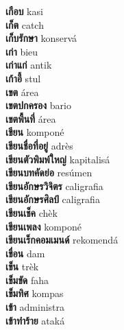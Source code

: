 \textbf{ เกือบ  } kasi \\
\textbf{ เก็ต  } catch \\
\textbf{ เก็บรักษา  } konservá \\
\textbf{ เก่า  } bieu \\
\textbf{ เก่าแก่  } antik \\
\textbf{ เก้าอี้  } stul \\
\textbf{ เขต  } área \\
\textbf{ เขตปกครอง  } bario \\
\textbf{ เขตพื้นที่  } área \\
\textbf{ เขียน  } komponé \\
\textbf{ เขียนชื่อที่อยู่  } adrès \\
\textbf{ เขียนตัวพิมพ์ใหญ่  } kapitalisá \\
\textbf{ เขียนบทคัดย่อ  } resúmen \\
\textbf{ เขียนอักษรวิจิตร  } caligrafia \\
\textbf{ เขียนอักษรศิลป์  } caligrafia \\
\textbf{ เขียนเช็ค  } chèk \\
\textbf{ เขียนเพลง  } komponé \\
\textbf{ เขียนเร็กคอมเมนด์  } rekomendá \\
\textbf{ เขื่อน  } dam \\
\textbf{ เข็น  } trèk \\
\textbf{ เข็มขัด  } faha \\
\textbf{ เข็มทิศ  } kompas \\
\textbf{ เข้า  } administra \\
\textbf{ เข้าทำร้าย  } ataká \\
